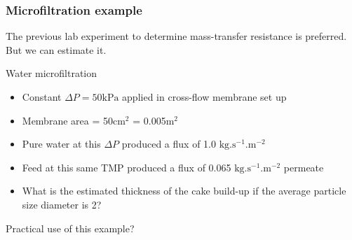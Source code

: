 \begin{frame}\frametitle{Microfiltration example}
	The previous lab experiment to determine mass-transfer resistance is preferred. But we can estimate it. 
	\vspace{12pt}
	\begin{exampleblock}{Water microfiltration}
		\begin{itemize}
			\item	Constant $\Delta P = 50\text{kPa}$ applied in cross-flow membrane set up
			\item	Membrane area = 50cm$^2$ = 0.005m$^2$
			\item	Pure water at this $\Delta P$ produced a flux of 1.0 $\text{kg}.\text{s}^{-1}\text{.m}^{-2}$
			\item	Feed at this same TMP produced a flux of 0.065 $\text{kg}.\text{s}^{-1}\text{.m}^{-2}$ permeate
			\item	What is the estimated thickness of the cake build-up if the average particle size diameter is 2\micron?
		\end{itemize}
	\end{exampleblock}
	\vfill
	Practical use of this example?
\end{frame}

